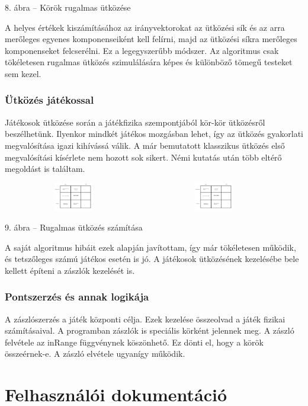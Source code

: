 \documentclass[bibliography=totocnumbered]{article}
\begin{document}
8. ábra -- Körök rugalmas ütközése

A helyes értékek kiszámításához az irányvektorokat az ütközési sík és az
arra merőleges egyenes komponenseiként kell felírni, majd az ütközési
síkra merőleges komponenseket felcserélni. Ez a legegyszerűbb módszer.
Az algoritmus csak tökéletesen rugalmas ütközés szimulálására képes és
különböző tömegű testeket sem kezel.


\subsubsection{Ütközés
játékossal}

Játékosok ütközése során a játékfizika szempontjából kör-kör ütközésről
beszélhetünk. Ilyenkor mindkét játékos mozgásban lehet, így az ütközés
gyakorlati megvalósítása igazi kihívássá válik. A már bemutatott
klasszikus ütközés első megvalósítási kísérlete nem hozott sok sikert.
Némi kutatás után több eltérő megoldást is találtam.

\includegraphics[width=2.42083in,height=0.48611in]{media/image5.png}
\includegraphics[width=2.42083in,height=0.48611in]{media/image6.png}

9. ábra -- Rugalmas ütközés számítása

A saját algoritmus hibáit ezek alapján javítottam, így már tökéletesen
működik, és tetszőleges számú játékos esetén is jó. A játékosok
ütközésének kezelésébe bele kellett építeni a zászlók kezelését is.


\subsubsection{Pontszerzés és annak
logikája}

A zászlószerzés a játék központi célja. Ezek kezelése összeolvad a játék
fizikai számításaival. A programban zászlók is speciális körként
jelennek meg. A zászló felvétele az inRange függvénynek köszönhető. Ez
dönti el, hogy a körök összeérnek-e. A zászló elvétele ugyanígy működik.


\section{Felhasználói
dokumentáció}
\end{document}
